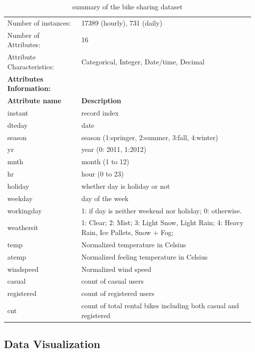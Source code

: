 \documentclass[12pt]{article}
\begin{document}
	\begin{table}[H]
		\begin{tabular}{| p{5cm} | p{11cm} |} \hline
			Number of instances: & 17389 (hourly), 731 (daily)\\
			Number of Attributes: & 16\\ 
			Attribute Characteristics: &  Categorical, Integer,
			Date/time, Decimal\\
			\hline \hline
			\textbf{Attributes Information:} &\\ \hline
			\textbf{Attribute name } & \textbf{Description}\\ \hline
			instant   & record index\\ \hline
			dteday    & date\\ \hline
			season   & season (1:springer, 2:summer, 3:fall, 4:winter)\\ \hline
			yr    &  year (0: 2011, 1:2012)\\ \hline
			mnth &   month (1 to 12)\\ \hline
			hr & hour (0 to 23) \\ \hline
			holiday   & whether day is holiday or not \\ \hline
			weekday   &  day of the week \\ \hline
			workingday   & 1: if day is neither weekend nor holiday; 0: otherwise.\\ \hline
			weathersit   & 1: Clear; 2: Mist; 3: Light Snow, Light Rain; 4: Heavy Rain, Ice Pallets, Snow + Fog;\\ \hline
			temp   & Normalized temperature in Celsius \\ \hline
			atemp    & Normalized feeling temperature in Celsius \\ \hline
			windspeed   & Normalized wind speed \\ \hline
			casual   & count of casual users\\ \hline
			registered   & count of registered users\\ \hline
			cnt   & count of total rental bikes including both casual and registered \\ \hline
		\end{tabular}
		\caption{summary of the bike sharing dataset}
			\label{table:dataset}
	\end{table}
	\subsection{Data Visualization}
	\label{sec:visual}
	
\end{document}
